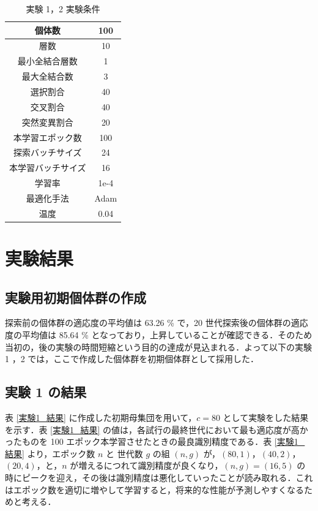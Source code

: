 \documentclass[twocolumn]{jarticle}     %
\begin{document}
\begin{table}[ht]
    \centering
    \caption{実験 1，2 実験条件}
    \begin{tabular}{|c|c|}
        \hline
        個体数&100 \\ \hline
        層数&10 \\ \hline
        最小全結合層数&1 \\ \hline
        最大全結合数&3 \\ \hline
        選択割合&40 \\ \hline
        交叉割合&40 \\ \hline
        突然変異割合&20 \\ \hline
        本学習エポック数&100 \\ \hline
        探索バッチサイズ&24 \\ \hline
        本学習バッチサイズ&16 \\ \hline
        学習率&1e-4 \\ \hline
        最適化手法&Adam \\ \hline
        温度&0.04 \\ \hline
    \end{tabular}
    \label{tab1}
\end{table}

\section{実験結果}

\subsection{実験用初期個体群の作成}
探索前の個体群の適応度の平均値は 63.26 \% で，20 世代探索後の個体群の適応度の平均値は 85.64 \% となっており，上昇していることが確認できる．そのため当初の，後の実験の時間短縮という目的の達成が見込まれる．よって以下の実験 1 ，2 では，ここで作成した個体群を初期個体群として採用した．

\subsection{実験 1 の結果}
表 \ref{実験1_結果} に作成した初期母集団を用いて，$c = 80$ として実験をした結果を示す．表 \ref{実験1_結果} の値は，各試行の最終世代において最も適応度が高かったものを 100 エポック本学習させたときの最良識別精度である．表 \ref{実験1_結果} より，エポック数 $n$ と 世代数 $g$ の組 $(n, g)$ が，$(80, 1)$，$(40, 2)$，$(20, 4)$，と，$n$ が増えるにつれて識別精度が良くなり，$(n, g) = (16, 5)$ の時にピークを迎え，その後は識別精度は悪化していったことが読み取れる．これはエポック数を適切に増やして学習すると，将来的な性能が予測しやすくなるためと考える．
\end{document}
